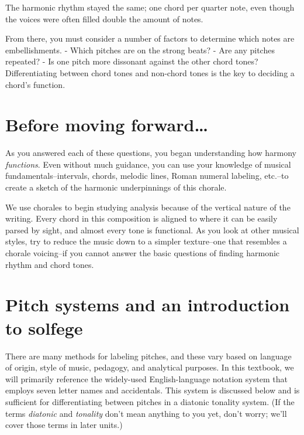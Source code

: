 \documentclass{book}
\begin{document}
The harmonic rhythm stayed the same; one chord per quarter note, even though
the voices were often filled double the amount of notes.

From there, you must consider a number of factors to determine which notes are
embellishments. - Which pitches are on the strong beats? - Are any pitches
repeated? - Is one pitch more dissonant against the other chord tones?
Differentiating between chord tones and non-chord tones is the key to deciding
a chord's function.

\hypertarget{before-moving-forward}{%
\section{Before moving forward\ldots{}}\label{before-moving-forward}}

As you answered each of these questions, you began understanding how harmony
\emph{functions}. Even without much guidance, you can use your knowledge of
musical fundamentals--intervals, chords, melodic lines, Roman numeral
labeling, etc.--to create a sketch of the harmonic underpinnings of this
chorale.

We use chorales to begin studying analysis because of the vertical nature of
the writing. Every chord in this composition is aligned to where it can be
easily parsed by sight, and almost every tone is functional. As you look at
other musical styles, try to reduce the music down to a simpler texture--one
that resembles a chorale voicing--if you cannot answer the basic questions of
finding harmonic rhythm and chord tones.

\hypertarget{pitch-systems-and-an-introduction-to-solfege}{%
\section{Pitch systems and an introduction to
solfege}\label{pitch-systems-and-an-introduction-to-solfege}}

There are many methods for labeling pitches, and these vary based on language
of origin, style of music, pedagogy, and analytical purposes. In this
textbook, we will primarily reference the widely-used English-language
notation system that employs seven letter names and accidentals. This system
is discussed below and is sufficient for differentiating between pitches in a
diatonic tonality system. (If the terms \emph{diatonic} and \emph{tonality}
don't mean anything to you yet, don't worry; we'll cover those terms in later
units.)
\end{document}
